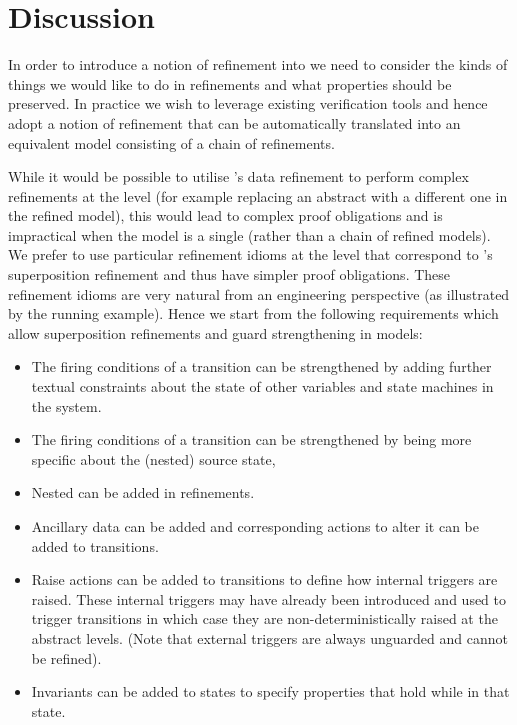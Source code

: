 
\section{Discussion}
\label{sec:discussion}

In order to introduce a notion of refinement into \SCXML we need to consider the kinds of things we would like to do in refinements and what properties should be preserved.
In practice we wish to leverage existing \EventB verification tools and hence adopt a notion of refinement that can be automatically translated into an equivalent \EventB model consisting of a chain of refinements.

While it would be possible to utilise \EventB's data refinement to perform complex refinements at the \statechart level (for example replacing an abstract \statechart with a different one in the refined model), this would lead to complex proof obligations and is impractical when the \SCXML model is a single \Statechart (rather than a chain of refined models).
We prefer to use particular refinement idioms at the \statechart level that correspond to \EventB's superposition refinement and thus have simpler proof obligations. 
These refinement idioms are very natural from an engineering perspective (as illustrated by the running example).
 Hence we start from the following requirements which allow superposition refinements and guard strengthening in \SCXML models:
\begin{itemize}
	\item The firing conditions of a transition can be strengthened by adding further textual constraints about the state of other variables and state machines in the system.
	\item The firing conditions of a transition can be strengthened by being more specific about the (nested) source state,
	\item Nested \Statecharts can be added in refinements.
	\item Ancillary data can be added and corresponding actions to alter it can be added to transitions.
	\item Raise actions can be added to transitions to define how internal triggers are raised. These internal triggers may have already been introduced and used to trigger transitions in which case they are non-deterministically raised at the abstract levels. (Note that external triggers are always unguarded and cannot be refined).
	\item Invariants can be added to states to specify properties that hold while in that state.
\end{itemize}

